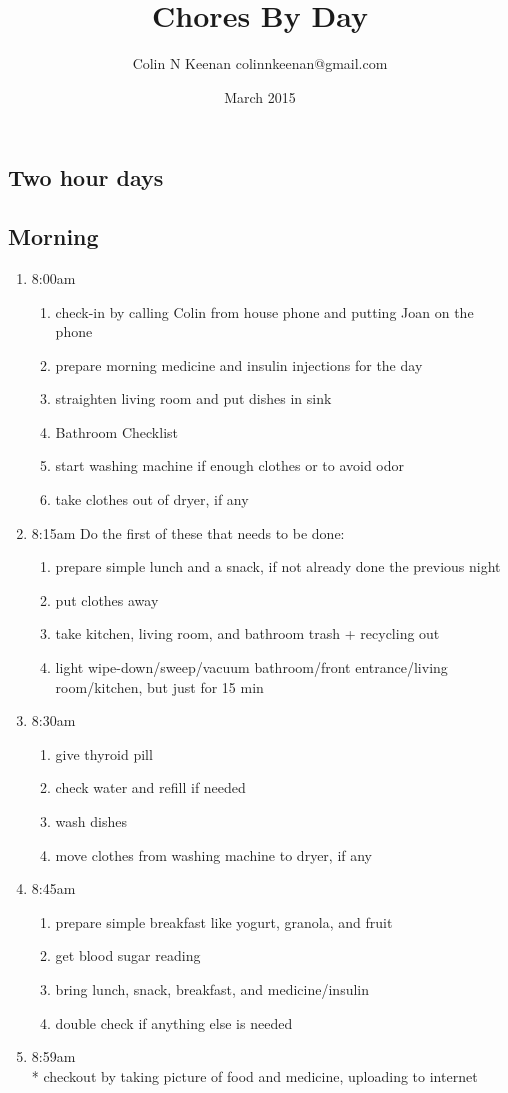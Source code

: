 \documentclass[12pt,letterpaper]{article}
\newcommand{\chorestitle}{Chores By Day}
\begin{document}
\title{\chorestitle{}}
\author{Colin N Keenan colinnkeenan@gmail.com}
\date{March 2015}
\thispagestyle{fancy}

\begin{multicols}{2} 
	\section*{Two hour days}
	\subsection*{Morning}
	\begin{enumerate}
		\item 8:00am
			\begin{enumerate}
				\item check-in by calling Colin from house phone and putting Joan on the phone
				\item prepare morning medicine and insulin injections for the day
				\item straighten living room and put dishes in sink
				\item Bathroom Checklist
				\item start washing machine if enough clothes or to avoid odor
				\item take clothes out of dryer, if any
			\end{enumerate}
		\item 8:15am
			Do the first of these that needs to be done:
			\begin{enumerate}
				\item prepare simple lunch and a snack, if not already done the previous night
				\item put clothes away
				\item take kitchen, living room, and bathroom trash + recycling out
				\item light wipe-down/sweep/vacuum bathroom/front entrance/living room/kitchen, but just for 15 min
			\end{enumerate}
		\item 8:30am
			\begin{enumerate}
				\item give thyroid pill
				\item check water and refill if needed
				\item wash dishes
				\item move clothes from washing machine to dryer, if any
			\end{enumerate}
		\item 8:45am
			\begin{enumerate}
				\item prepare simple breakfast like yogurt, granola, and fruit
				\item get blood sugar reading
				\item bring lunch, snack, breakfast, and medicine/insulin
				\item double check if anything else is needed
			\end{enumerate}
		\item 8:59am \\*
			checkout by taking picture of food and medicine, uploading to internet
	\end{enumerate}


\end{multicols}
\end{document}
